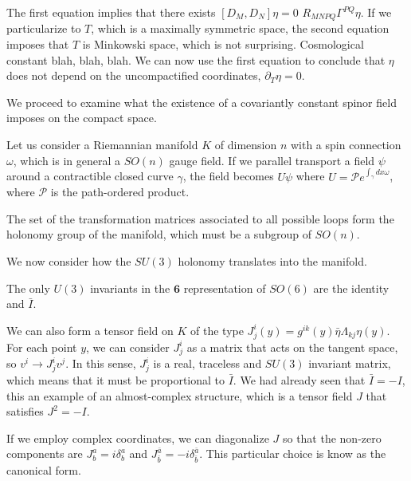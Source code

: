 The first equation implies that there exists $[D_M,D_N]\eta=0$ $R_{MNPQ} \Gamma^{PQ} \eta$.
If we particularize to $T$, which is a maximally symmetric space, the second equation imposes that
$T$ is Minkowski space, which is not surprising.
Cosmological constant blah, blah, blah.
We can now use the first equation to conclude that $\eta$ does not depend on the uncompactified 
coordinates,  $\partial_T \eta=0$.

We proceed to examine what the existence of a covariantly constant spinor field imposes on the compact space. 

Let us consider a Riemannian manifold $K$ of dimension $n$ with a spin connection $\omega$, which 
is in general a $SO(n)$ gauge field.
If we parallel transport a field $\psi$ around a contractible closed curve $\gamma$, the field becomes
$U\psi$ where $U=\mathcal P e^{\int_\gamma dx \omega}$, where $\mathcal P$ is the path-ordered product.

The set of the transformation matrices associated to all possible loops form the holonomy group of the manifold, 
which must be a subgroup of $SO(n)$.


We now consider how the $SU(3)$ holonomy translates into the manifold. 


The only  $U(3)$ invariants in the $\mathbf{6}$ representation of $SO(6)$ are the identity and
$\bar I$.

We can also form a tensor field on $K$ of the type $J^i_j(y)=g^{ik}(y) \bar\eta \Lambda_{kj} \eta(y)$.
For each point $y$, we can consider $J^i_j$ as a matrix that acts on the tangent space, so $v^i \to J^i_j v^j$.
In this sense, $J^i_j$ is a real, traceless and $SU(3)$ invariant matrix, which means that it must be proportional
to $\bar I$.
We had already seen that $\bar I = -I$, this an example of an almost-complex structure, which is 
a tensor field $J$ that satisfies $J^2=-I$.

If we employ complex coordinates, we can diagonalize $J$ so that the non-zero components are
$J^a_b=i\delta^a_b$ and $J^{\bar a}_{\bar b}=-i\delta^{\bar a}_{\bar b}$. This particular choice
is know as the canonical form.


